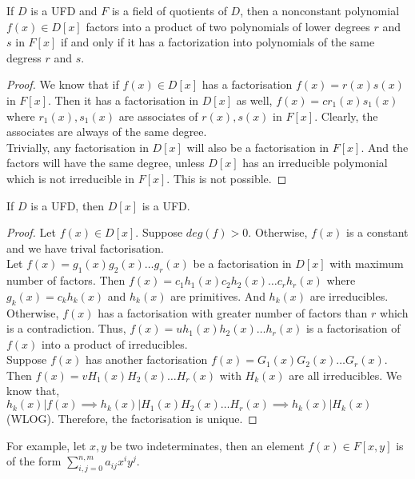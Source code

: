 \begin{corollary}
	If $D$ is a UFD and $F$ is a field of quotients of $D$, then a nonconstant polynomial $f(x) \in D[x]$ factors into a product of two polynomials of lower degrees $r$ and $s$ in $F[x]$ if and only if it has a factorization into polynomials of the same degress $r$ and $s$.
\end{corollary}
\begin{proof}
	We know that if $f(x) \in D[x]$ has a factorisation $f(x) = r(x)s(x)$ in $F[x]$.
	Then it has a factorisation in $D[x]$ as well, $f(x) = cr_1(x)s_1(x)$ where $r_1(x),s_1(x)$ are associates of $r(x), s(x)$ in $F[x]$.
	Clearly, the associates are always of the same degree.\\

	Trivially, any factorisation in $D[x]$ will also be a factorisation in $F[x]$.
	And the factors will have the same degree, unless $D[x]$ has an irreducible polymonial which is not irreducible in $F[x]$.
	This is not possible.
\end{proof}

\begin{theorem}
	If $D$ is a UFD, then $D[x]$ is a UFD.
\end{theorem}
\begin{proof}
	Let $f(x) \in D[x]$.
	Suppose $deg(f) > 0$.
	Otherwise, $f(x)$ is a constant and we have trival factorisation.\\
	
	Let $f(x) = g_1(x)g_2(x)\dots g_r(x)$ be a factorisation in $D[x]$ with maximum number of factors.	
	Then $f(x) = c_1h_1(x)c_2h_2(x)\dots c_rh_r(x)$ where $g_k(x) = c_kh_k(x)$ and $h_k(x)$ are primitives.
	And $h_k(x)$ are irreducibles.
	Otherwise, $f(x)$ has a factorisation with greater number of factors than $r$ which is a contradiction.
	Thus, $f(x) = uh_1(x)h_2(x)\dots h_r(x)$ is a factorisation of $f(x)$ into a product of irreducibles.\\

	Suppose $f(x)$ has another factorisation $f(x) = G_1(x)G_2(x)\dots G_r(x)$.
	Then $f(x) = vH_1(x)H_2(x)\dots H_r(x)$ with $H_k(x)$ are all irreducibles.
	We know that, $h_k(x) | f(x) \implies h_k(x) | H_1(x)H_2(x)\dots H_r(x) \implies h_k(x) | H_k(x)$ (WLOG).
	Therefore, the factorisation is unique.
\end{proof}

For example, let $x,y$ be two indeterminates, then an element $f(x) \in F[x,y]$ is of the form $\displaystyle\sum_{i,j = 0}^{n,m} a_{ij}x^i y^j$.

